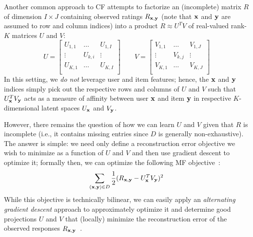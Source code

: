 Another common approach to CF attempts to factorize an (incomplete)
matrix $R$ of dimension $I \times J$ containing observed ratings $R_{\mathbf{x},\mathbf{y}}$ 
(note that $\mathbf{x}$ and $\mathbf{y}$ are assumed to row and column indices)
into a product $R \approx U^T V$ of real-valued
rank-$K$ matrices $U$ and $V$:
\begin{equation*}
U = 
\begin{bmatrix}
  U_{1,1} & \hdots  & U_{1,I} \\
  \vdots  & U_{k,i} & \vdots  \\
  U_{K,1} & \hdots  & U_{K,I} \\
\end{bmatrix}
\qquad 
V = 
\begin{bmatrix}
  V_{1,1} & \hdots  & V_{1,J} \\
  \vdots  & V_{k,j} & \vdots  \\
  V_{K,1} & \hdots  & V_{K,J} \\
\end{bmatrix}
\end{equation*}
In this setting, we \emph{do not} leverage user and item features;
hence, the $\mathbf{x}$ and $\mathbf{y}$ indices simply pick out the respective
rows and columns of $U$ and $V$ such that $U_{\mathbf{x}}^T V_{\mathbf{y}}$ acts as a
measure of affinity between user $\mathbf{x}$ and item $\mathbf{y}$ in respective
$K$-dimensional latent spaces $U_{\mathbf{x}}$ and $V_{\mathbf{y}}$.

However, there remains the question of how we can learn $U$ and $V$
given that $R$ is incomplete (i.e., it contains missing entries since
$D$ is generally non-exhaustive).  The answer is simple: we need only
define a reconstruction error objective we wish to minimize as a
function of $U$ and $V$ and then use gradient descent to optimize it;
formally then, we can optimize the following MF objective~\cite{pmf}:
\begin{align}
\sum_{(\mathbf{x},\mathbf{y}) \in D} \frac{1}{2} (R_{\mathbf{x},\mathbf{y}} - U_{\mathbf{x}}^T V_{\mathbf{y}})^2
\end{align}
While this objective is technically bilinear, 
we can easily apply an
\emph{alternating gradient descent} approach to approximately
optimize it and determine good projections $U$ and
$V$ that (locally) minimize the reconstruction error of the observed
responses $R_{\mathbf{x},\mathbf{y}}$~\cite{pmf}.

